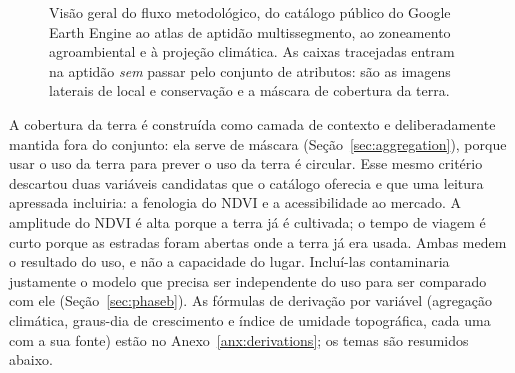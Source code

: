 \begin{figure}[htbp]
\caption[Visão geral do fluxo metodológico]{Visão geral do fluxo metodológico, do catálogo público
do Google Earth Engine ao atlas de aptidão multissegmento, ao zoneamento agroambiental e à
projeção climática. As caixas tracejadas entram na aptidão \emph{sem} passar pelo conjunto de
atributos: são as imagens laterais de local e conservação e a máscara de cobertura da
terra.}\label{fig:metodologia}
\end{figure}

A cobertura da terra é construída como camada de contexto e deliberadamente mantida
fora do conjunto: ela serve de máscara (Seção~\ref{sec:aggregation}), porque usar o uso da terra
para prever o uso da terra é circular. Esse mesmo critério descartou duas variáveis candidatas que
o catálogo oferecia e que uma leitura apressada incluiria: a fenologia do NDVI e a acessibilidade
ao mercado. A amplitude do NDVI é alta porque a terra já é cultivada; o tempo de viagem é curto porque
as estradas foram abertas onde a terra já era usada. Ambas medem o resultado do uso, e não a capacidade
do lugar. Incluí-las contaminaria justamente o modelo que precisa ser independente do uso para ser
comparado com ele (Seção~\ref{sec:phaseb}). As fórmulas de derivação por variável (agregação
climática, graus-dia de crescimento e índice de umidade topográfica, cada uma com a sua fonte) estão no
Anexo~\ref{anx:derivations}; os temas são resumidos abaixo.

